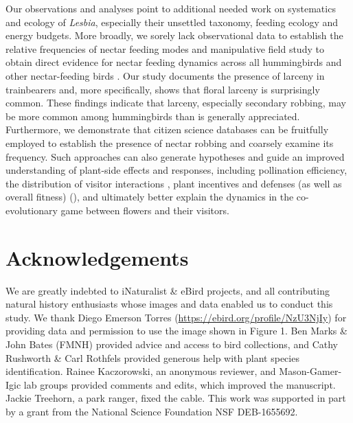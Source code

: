 \documentclass[fleqn,10pt,lineno]{wlpeerj}
\begin{document}
Our observations and analyses point to additional needed work on systematics and ecology of \textit{Lesbia}, especially their unsettled taxonomy, feeding ecology and energy budgets.  %
More broadly, we sorely lack observational data to establish the relative frequencies of nectar feeding modes and manipulative field study to obtain direct evidence for nectar feeding dynamics across all hummingbirds and other nectar-feeding birds \citep{irwin2010}.
Our study documents the presence of larceny in trainbearers and, more specifically, shows that floral larceny is surprisingly common. 
These findings indicate that larceny, especially secondary robbing, may be more common among hummingbirds than is generally appreciated.
Furthermore, we demonstrate that citizen science databases can be fruitfully employed to establish the presence of nectar robbing and coarsely examine its frequency.
Such approaches can also generate hypotheses and guide an improved understanding of plant-side effects and responses, including pollination efficiency, the distribution of visitor interactions \citep{maloof2000,arizmendi2001}, plant incentives and defenses (as well as overall fitness) (\citealt{pelayo2011}), and ultimately better explain the dynamics in the co-evolutionary game between flowers and their visitors.

\section*{Acknowledgements}

We are greatly indebted to iNaturalist \& eBird projects, and all contributing natural history enthusiasts whose images and data enabled us to conduct this study. 
We thank Diego Emerson Torres (\href{https://ebird.org/profile/NzU3NjIy}{https://ebird.org/profile/NzU3NjIy}) for providing data and permission to use the image shown in Figure 1. 
Ben Marks \& John Bates (FMNH) provided advice and access to bird collections, and Cathy Rushworth \& Carl Rothfels provided generous help with plant species identification. 
Rainee Kaczorowski, an anonymous reviewer, and Mason-Gamer-Igic lab groups provided comments and edits, which improved the manuscript.
Jackie Treehorn, a park ranger, fixed the cable.
This work was supported in part by a grant from the National Science Foundation NSF DEB-1655692.
\end{document}

